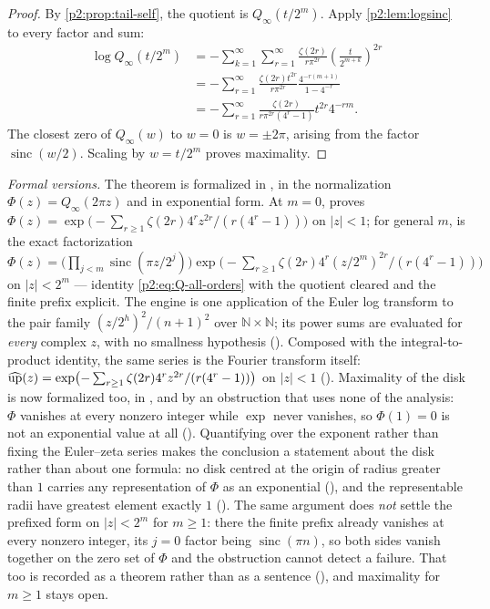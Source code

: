 \documentclass[11pt,oneside]{article}
\numberwithin{equation}{section}
\theoremstyle{definition}
\theoremstyle{remark}
\newcommand{\N}{\mathbb N}
\newcommand{\sinc}{\operatorname{sinc}}
\begin{document}
\begin{proof}
By \cref{p2:prop:tail-self}, the quotient is $Q_\infty(t/2^m)$.  Apply
\cref{p2:lem:logsinc} to every factor and sum:
\begin{align*}
 \log Q_\infty(t/2^m)
 &=-\sum_{k=1}^{\infty}\sum_{r=1}^{\infty}
   \frac{\zeta(2r)}{r\pi^{2r}}
   \left(\frac{t}{2^{m+k}}\right)^{2r}\\
 &=-\sum_{r=1}^{\infty}\frac{\zeta(2r)t^{2r}}{r\pi^{2r}}
   \frac{4^{-r(m+1)}}{1-4^{-r}}\\
 &=-\sum_{r=1}^{\infty}
   \frac{\zeta(2r)}{r\pi^{2r}(4^r-1)}t^{2r}4^{-rm}.
\end{align*}
The closest zero of $Q_\infty(w)$ to $w=0$ is $w=\pm2\pi$, arising from the factor
$\sinc(w/2)$.  Scaling by $w=t/2^m$ proves maximality.
\end{proof}

\emph{Formal versions.}  The theorem is formalized in , in the
normalization $\Phi(z)=Q_\infty(2\pi z)$ and in exponential form.  At $m=0$,
 proves
$\Phi(z)=\exp\bigl(-\sum_{r\ge1}\zeta(2r)4^rz^{2r}/(r(4^r-1))\bigr)$ on $|z|<1$; for general
$m$,  is the exact factorization
$\Phi(z)=\bigl(\prod_{j<m}\sinc(\pi z/2^j)\bigr)\exp\bigl(-\sum_{r\ge1}
\zeta(2r)4^r(z/2^m)^{2r}/(r(4^r-1))\bigr)$ on $|z|<2^m$ --- identity \eqref{p2:eq:Q-all-orders}
with the quotient cleared and the finite prefix explicit.  The engine is one application of
the Euler log transform to the pair family $(z/2^h)^2/(n+1)^2$ over $\N\times\N$; its power
sums are evaluated for \emph{every} complex $z$, with no smallness hypothesis
().  Composed with the integral-to-product identity, the
same series is the Fourier transform itself:
$\widehat{\operatorname{up}}(z)=\exp\bigl(-\sum_{r\ge1}\zeta(2r)4^rz^{2r}/(r(4^r-1))\bigr)$ on $|z|<1$
().  Maximality of the disk is now formalized too, in
, and by an obstruction that uses none of the analysis:
$\Phi$ vanishes at every nonzero integer while $\exp$ never vanishes, so $\Phi(1)=0$ is not
an exponential value at all
().  Quantifying over the exponent rather
than fixing the Euler--zeta series makes the conclusion a statement about the disk rather
than about one formula: no disk centred at the origin of radius greater than $1$ carries any
representation of $\Phi$ as an exponential
(), and the representable radii have greatest
element exactly $1$
().  The same argument does \emph{not}
settle the prefixed form on $|z|<2^m$ for $m\ge1$: there the finite prefix already vanishes at
every nonzero integer, its $j=0$ factor being $\sinc(\pi n)$, so both sides vanish together on
the zero set of $\Phi$ and the obstruction cannot detect a failure.  That too is recorded as a
theorem rather than as a sentence
(), and maximality for $m\ge1$ stays open.
\end{document}
